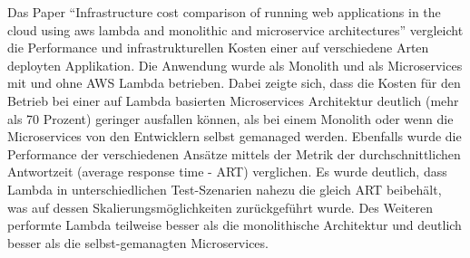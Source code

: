 Das Paper "`Infrastructure cost comparison of running web applications in the cloud using aws lambda and monolithic and microservice architectures"'\cite{villamizar_infrastructure_2016} vergleicht die Performance und infrastrukturellen Kosten einer auf verschiedene Arten deployten Applikation. Die Anwendung wurde als Monolith und als Microservices mit und ohne AWS Lambda betrieben. Dabei zeigte sich,  dass die Kosten für den Betrieb bei einer auf Lambda basierten Microservices Architektur deutlich (mehr als 70 Prozent) geringer ausfallen können, als bei einem Monolith oder wenn die Microservices von den Entwicklern selbst gemanaged werden. Ebenfalls wurde die Performance der verschiedenen Ansätze mittels der Metrik der durchschnittlichen Antwortzeit (average response time - ART) verglichen. Es wurde deutlich, dass Lambda in unterschiedlichen Test-Szenarien nahezu die gleich ART beibehält, was auf dessen Skalierungsmöglichkeiten zurückgeführt wurde. Des Weiteren performte Lambda teilweise besser als die monolithische Architektur und deutlich besser als die selbst-gemanagten Microservices.